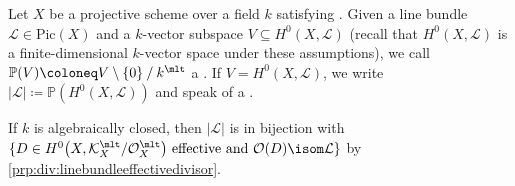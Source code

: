 \documentclass[wip, algebra]{bsteffan-lecturenotes}
\newcommand{\cO}{\mathcal{O}}
\newcommand{\cK}{\mathcal{K}}
\newcommand{\cL}{\mathcal{L}}
\renewcommand{\P}{\mathbb{P}}
\newcommand{\Pic}{\mathrm{Pic}}
\begin{document}
\begin{definition}
	Let $X$ be a projective scheme over a field $k$ satisfying .
	Given a line bundle $\cL \in \Pic(X)$ and a $k$-vector subspace $V \subseteq H^0(X, \cL)$ (recall that $H^0(X, \cL)$ is a finite-dimensional $k$-vector space under these assumptions), we call $\P(V) \coloneq V \setminus \{0\} \mathbin{/} k^\mlt$ a .
	If $V = H^0(X, \cL)$, we write $|\cL| \coloneq \P(H^0(X, \cL))$ and speak of a .
\end{definition}
\begin{remark}
	If $k$ is algebraically closed, then $|\cL|$ is in bijection with $\{D \in H^0\big(X, \cK_X^\mlt / \cO_X^\mlt\big) \text{ effective and } \cO(D) \isom \cL\}$ by \cref{prp:div:linebundleeffectivedivisor}.
\end{remark}

\printindex
\printbibliography
\end{document}
